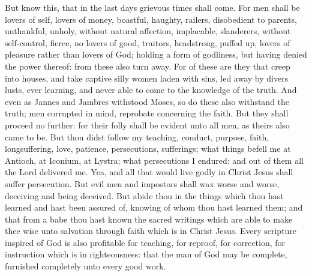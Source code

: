 But know this, that in the last days grievous times shall come. For men shall be lovers of self, lovers of money, boastful, haughty, railers, disobedient to parents, unthankful, unholy, without natural affection, implacable, slanderers, without self-control, fierce, no lovers of good, traitors, headstrong, puffed up, lovers of pleasure rather than lovers of God; holding a form of godliness, but having denied the power thereof: from these also turn away. For of these are they that creep into houses, and take captive silly women laden with sins, led away by divers lusts, ever learning, and never able to come to the knowledge of the truth. And even as Jannes and Jambres withstood Moses, so do these also withstand the truth; men corrupted in mind, reprobate concerning the faith. But they shall proceed no further: for their folly shall be evident unto all men, as theirs also came to be. But thou didst follow my teaching, conduct, purpose, faith, longsuffering, love, patience, persecutions, sufferings; what things befell me at Antioch, at Iconium, at Lystra; what persecutions I endured: and out of them all the Lord delivered me. Yea, and all that would live godly in Christ Jesus shall suffer persecution. But evil men and impostors shall wax worse and worse, deceiving and being deceived. But abide thou in the things which thou hast learned and hast been assured of, knowing of whom thou hast learned them; and that from a babe thou hast known the sacred writings which are able to make thee wise unto salvation through faith which is in Christ Jesus. Every scripture inspired of God is also profitable for teaching, for reproof, for correction, for instruction which is in righteousness: that the man of God may be complete, furnished completely unto every good work. 

